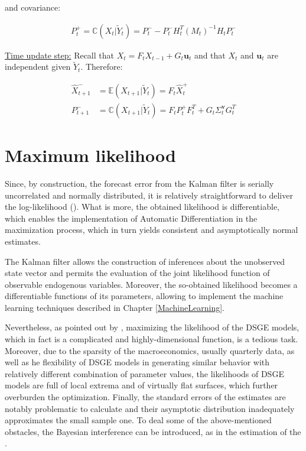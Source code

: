 \documentclass{pracamgr}
\numberwithin{equation}{section}
\begin{document}
and covariance:

\begin{align}
P_{t}^{+} = \mathbb{C} (X_{t} | \tilde{Y}_{t} ) = P_{t}^{-} - P_{t}^{-} H_{t}^{T}\left(M_{t} \right)^{-1} H_{t} P_{t}^{-}
\end{align}

\underline{Time update step:} Recall that $X_{t} = F_{t} X_{t-1} + G_{t} \mathbf{u}_{t}$ and that $X_{t}$ and $ \mathbf{u}_{t}$ are independent given $\tilde{Y}_{t}$. Therefore:

\begin{align}
\hat{X}_{t+1}^{-} &= \mathbb{E} (X_{t+1} | \tilde{Y}_{t} ) = F_{t} \hat{X}_{t}^{+} \\
P_{t+1}^{-} &= \mathbb{C} (X_{t+1} | \tilde{Y}_{t} ) = F_{t} P_{t}^{+} F_{t}^{T} + G_{t}\Sigma_{t}^{\mathbf{v}}G_{t}^{T}
\end{align} 

\section{Maximum likelihood}

Since, by construction, the forecast error from the Kalman filter is serially uncorrelated and normally distributed, it is relatively straightforward to deliver the log-likelihood (\citet{ireland2004method}). What is more, the obtained likelihood is differentiable, which enables the implementation of Automatic Differentiation in the maximization process, which in turn yields consistent and asymptotically normal estimates.

The Kalman filter allows the construction of inferences about the unobserved state vector and permits the evaluation of the joint likelihood function of observable endogenous variables. Moreover, the so-obtained likelihood becomes a differentiable functions of its parameters, allowing to implement the machine learning techniques described in Chapter \ref{MachineLearning}.

Nevertheless, as pointed out by \citet{fernandez2010econometrics}, maximizing the likelihood of the DSGE models, which in fact is a complicated and highly-dimensional function, is a tedious task. Moreover, due to the sparsity of the macroeconomics, usually quarterly data, as well as he flexibility of DSGE models in generating similar behavior with relatively different combination of parameter values, the likelihoods of DSGE models are full of local extrema and of virtually flat surfaces, which further overburden the optimization. Finally, the standard errors of the estimates are notably problematic to calculate and their asymptotic distribution inadequately approximates the small sample one. To deal some of the above-mentioned obstacles, the Bayesian interference can be introduced, as in the estimation of the \citet{smets2003estimated}.
\end{document}
